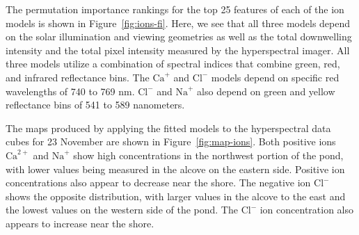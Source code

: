 \documentclass[remotesensing,article,accept,pdftex,moreauthors]{Definitions/mdpi}
\begin{document}
The permutation importance rankings for the top 25 features of each of the ion models is shown in Figure~\ref{fig:ions-fi}. Here, we see that all three models depend on the solar illumination and viewing geometries as well as the total downwelling intensity and the total pixel intensity measured by the hyperspectral imager. All three models utilize a combination of spectral indices that combine green, red, and infrared reflectance bins. The $\textrm{Ca}^{+}$ and $\textrm{Cl}^{-}$ models depend on specific red wavelengths of 740 to 769 nm. $\textrm{Cl}^{-}$ and $\textrm{Na}^{+}$ also depend on green and yellow reflectance bins of 541 to 589 nanometers.

The maps produced by applying the fitted models to the hyperspectral data cubes for 23 November are shown in Figure~\ref{fig:map-ions}. Both positive ions $\mathrm{Ca}^{2+}$ and $\mathrm{Na}^{+}$ show high concentrations in the northwest portion of the pond, with lower values being measured in the alcove on the eastern side. Positive ion concentrations also appear to decrease near the shore. The negative ion $\mathrm{Cl}^{-}$ shows the opposite distribution, with larger values in the alcove to the east and the lowest values on the western side of the pond. The $\mathrm{Cl}^{-}$ ion concentration also appears to increase near the shore.
\end{document}
